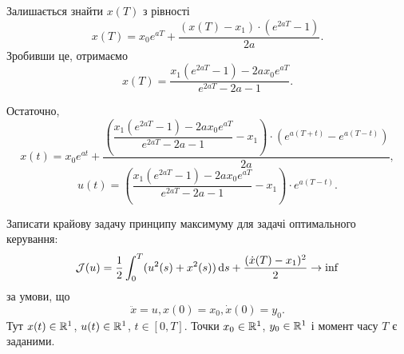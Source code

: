\begin{solution}

	Залишається знайти $x(T)$ з рівності 
	\begin{equation}
		x(T) = x_0 e^{a T} + \dfrac{(x(T) - x_1) \cdot (e^{2 a T} - 1)}{2 a}.
	\end{equation}
	Зробивши це, отримаємо
	\begin{equation}
		x(T) = \dfrac{x_1 (e^{2 a T} - 1) - 2 a x_0 e^{a T}}{e^{2 a T} - 2 a - 1}.
	\end{equation}

	Остаточно,
	\begin{equation}
		x(t) = x_0 e^{a t} + \dfrac{\left(\dfrac{x_1 (e^{2 a T} - 1) - 2 a x_0 e^{a T}}{e^{2 a T} - 2 a - 1} - x_1\right) \cdot \left(e^{a (T + t)} - e^{a (T - t)}\right)}{2 a},
	\end{equation}	
	\begin{equation}
		u(t) = \left(\dfrac{x_1 (e^{2 a T} - 1) - 2 a x_0 e^{a T}}{e^{2 a T} - 2 a - 1} - x_1\right) \cdot e^{a (T - t)}.
	\end{equation}
\end{solution}

\begin{problem}
    Записати крайову задачу принципу максимуму для задачі оптимального керування:
    \begin{equation*}
        \mathcal{J}(u) = \dfrac12 \int_0^T (u^2(s) + x^2(s)) \mathop{}\!\mathrm{d} s + \dfrac{(\dot x(T) - x_1)^2}{2} \to \inf
    \end{equation*}
    за умови, що
    \begin{equation*}
        \ddot x = u, x(0) = x_0, \dot x(0) = y_0.
    \end{equation*}
    Тут $x(t) \in \mathbb{R}^1$, $u(t) \in \mathbb{R}^1$, $t \in [0, T]$. Точки $x_0 \in \mathbb{R}^1$, $y_0 \in \mathbb{R}^1$ і момент часу $T$ є заданими.
\end{problem}

